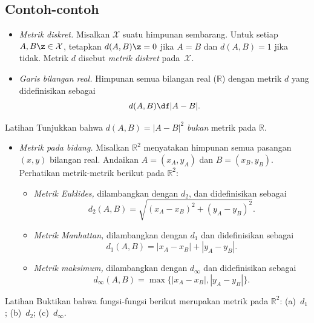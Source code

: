 \pagebreak

\subsection*{Contoh-contoh}

\begin{itemize}
\item {}\emph{Metrik diskret.} Misalkan $\mathcal X$ suatu himpunan sembarang. 
Untuk setiap $A,B\z\in\mathcal X$, tetapkan $d(A,B)\z=0$ jika $A=B$ dan $d(A,B)=1$ jika tidak.
Metrik $d$ disebut \emph{metrik diskret} pada~$\mathcal X$.
\item{}\emph{Garis bilangan real.}
Himpunan semua bilangan real ($\mathbb{R}$) dengan metrik $d$ yang didefinisikan sebagai 
$$d(A,B)\df|A-B|.$$
\end{itemize}

\begin{thm}{Latihan}\label{ex:dist-square}
Tunjukkan bahwa $d(A,B)=|A-B|^2$ \textit{bukan} metrik pada $\mathbb{R}$.
\end{thm}

\begin{itemize}
\item \textit{Metrik pada bidang.}
Misalkan $\mathbb{R}^2$ menyatakan himpunan semua pasangan $(x,y)$ bilangan real.
Andaikan $A=(x_A,y_A)$ dan $B=(x_B,y_B)$.
Perhatikan metrik-metrik berikut pada $\mathbb{R}^2$:
\begin{itemize}
\item{}\emph{Metrik Euklides,} dilambangkan dengan $d_2$, dan didefinisikan sebagai \label{def:d_2}
$$d_2(A,B)=\sqrt{(x_A-x_B)^2+(y_A-y_B)^2}.$$
\item\label{Manhattan plane}\emph{Metrik Manhattan,} dilambangkan dengan $d_1$ dan didefinisikan sebagai 
$$d_1(A,B)=|x_A-x_B|+|y_A-y_B|.$$
\item{}\emph{Metrik maksimum,} dilambangkan dengan $d_\infty$ dan didefinisikan sebagai 
$$d_\infty(A,B)=\max\{|x_A-x_B|,|y_A-y_B|\}.$$
\end{itemize}
\end{itemize}

\begin{thm}{Latihan}\label{ex:d_1+d_2+d_infty}
Buktikan bahwa fungsi-fungsi berikut merupakan metrik pada $\mathbb{R}^2$:
(a)~$d_1$; (b)~$d_2$; (c)~$d_\infty$.
\end{thm}



